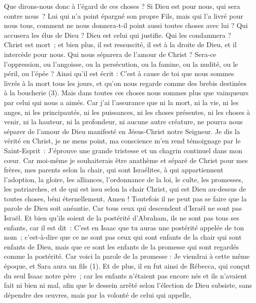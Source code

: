 \begin{multicols}{2}
Que dirons-nous donc à l’égard de ces choses ? Si Dieu est pour nous, qui sera contre nous ?
Lui qui n'a point épargné son propre Fils, mais qui l'a livré pour nous tous, comment ne nous donnera-t-il point aussi toutes choses avec lui ?
Qui accusera les élus de Dieu ? Dieu est celui qui justifie.
Qui les condamnera ? Christ est mort ; et bien plus, il est ressuscité, il est à la droite de Dieu, et il intercède pour nous.
Qui nous séparera de l'amour de Christ ? Sera-ce l'oppression, ou l'angoisse, ou la persécution, ou la famine, ou la nudité, ou le péril, ou l'épée ?
Ainsi qu'il est écrit : C’est à cause de toi que nous sommes livrés à la mort tous les jours, et qu’on nous regarde comme des brebis destinées à la boucherie (3).
Mais dans toutes ces choses nous sommes plus que vainqueurs par celui qui nous a aimés.
Car j’ai l’assurance que ni la mort, ni la vie, ni les anges, ni les principautés, ni les puissances, ni les choses présentes, ni les choses à venir,
ni la hauteur, ni la profondeur, ni aucune autre créature, ne pourra nous séparer de l'amour de Dieu manifesté en Jésus-Christ notre Seigneur.
\VerseOne{}Je dis la vérité en Christ, je ne mens point, ma conscience m’en rend témoignage par le Saint-Esprit :
J’éprouve une grande tristesse et un chagrin continuel dans mon cœur.
Car moi-même je souhaiterais être anathème et séparé de Christ pour mes frères, mes parents selon la chair,
qui sont Israélites, à qui appartiennent l'adoption, la gloire, les alliances, l'ordonnance de la loi, le culte,
les promesses, les patriarches, et de qui est issu selon la chair Christ, qui est Dieu au-dessus de toutes choses, béni éternellement, Amen !
Toutefois il ne peut pas se faire que la parole de Dieu soit anéantie. Car tous ceux qui descendent d’Israël ne sont pas Israël.
Et bien qu’ils soient de la postérité d'Abraham, ils ne sont pas tous ses enfants, car il est dit : C'est en Isaac que tu auras une postérité appelée de ton nom ;
c'est-à-dire que ce ne sont pas ceux qui sont enfants de la chair qui sont enfants de Dieu, mais que ce sont les enfants de la promesse qui sont regardés comme la postérité.
Car voici la parole de la promesse : Je viendrai à cette même époque, et Sara aura un fils (1).
Et de plus, il en fut ainsi de Rébecca, qui conçut du seul Isaac notre père ;
car les enfants n’étaient pas encore nés et ils n’avaient fait ni bien ni mal, afin que le dessein arrêté selon l'élection de Dieu subsiste, sans dépendre des œuvres, mais par la volonté de celui qui appelle,

\end{multicols}
